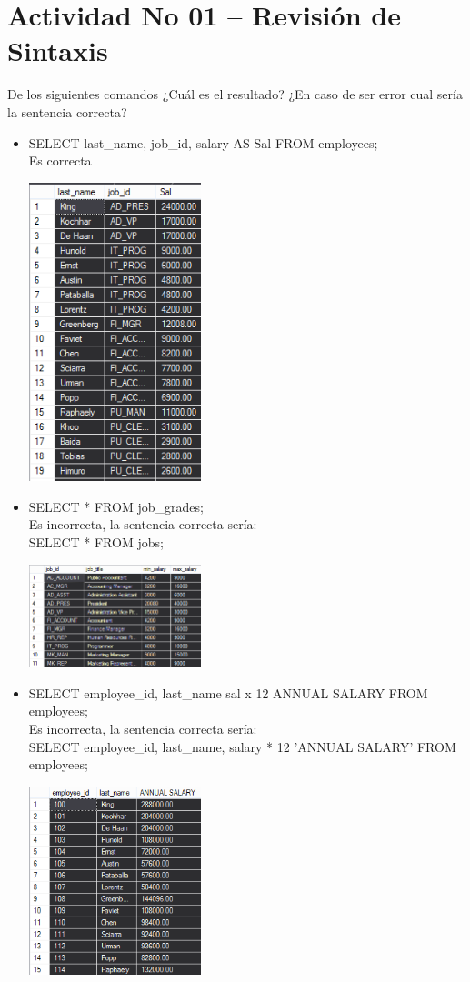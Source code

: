 \section{Actividad No 01 – Revisi\'on de Sintaxis} 
De los siguientes comandos ¿Cuál es el resultado? ¿En caso de ser error cual sería la sentencia correcta?

\begin{itemize}
	\item SELECT last\_name, job\_id, salary AS Sal FROM employees;
	\\Es correcta
	\begin{center}
	\includegraphics[width=5cm]{./Imagenes/411} 
	\end{center}

	\item SELECT * FROM job\_grades;
	\\Es incorrecta, la sentencia correcta sería:
	\\SELECT * FROM jobs;
	\begin{center}
	\includegraphics[width=5cm]{./Imagenes/412} 
	\end{center}
	
	\item SELECT employee\_id, last\_name sal x 12 ANNUAL SALARY FROM employees;
	\\Es incorrecta, la sentencia correcta sería:
	\\SELECT employee\_id, last\_name, salary * 12 'ANNUAL SALARY' FROM employees;
	\begin{center}
	\includegraphics[width=5cm]{./Imagenes/413} 
	\end{center}

\end{itemize} 
